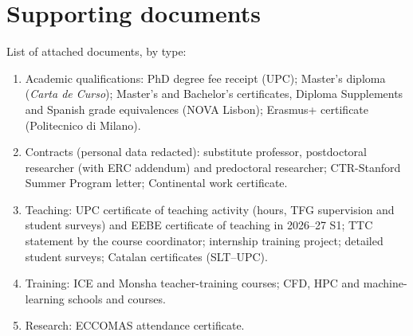 \documentclass[11pt]{article}
\begin{document}

\newpage
\section{Supporting documents}
List of attached documents, by type:
\begin{enumerate}[itemsep=0pt]
\item Academic qualifications: PhD degree fee receipt (UPC); Master's diploma
(\emph{Carta de Curso}); Master's and Bachelor's certificates, Diploma Supplements and Spanish grade equivalences (NOVA Lisbon);
Erasmus+ certificate (Politecnico di Milano).
\item Contracts (personal data redacted): substitute professor, postdoctoral researcher
(with ERC addendum) and predoctoral researcher; CTR-Stanford Summer Program letter;
Continental work certificate.
\item Teaching: UPC certificate of teaching activity (hours, TFG supervision and student surveys) and EEBE certificate of teaching in 2026--27 S1; TTC statement by
the course coordinator; internship training project; detailed student surveys; Catalan certificates (SLT--UPC).
\item Training: ICE and Monsha teacher-training courses; CFD, HPC and machine-learning schools and courses.
\item Research: ECCOMAS attendance
certificate.
\end{enumerate}
\end{document}
